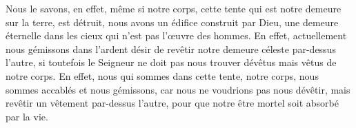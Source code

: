 Nous le savons, en effet, même si notre corps,
		cette tente qui est notre demeure sur la terre,
		est détruit,
	nous avons un édifice construit par Dieu,
	une demeure éternelle dans les cieux qui n’est pas l’œuvre des hommes.
En effet, actuellement nous gémissons
		dans l’ardent désir de revêtir notre demeure céleste par-dessus l’autre,
	si toutefois le Seigneur ne doit pas nous trouver dévêtus
		mais vêtus de notre corps.
En effet, nous qui sommes dans cette tente, notre corps,
	nous sommes accablés et nous gémissons,
	car nous ne voudrions pas nous dévêtir,
	mais revêtir un vêtement par-dessus l’autre,
	pour que notre être mortel soit absorbé par la vie.
